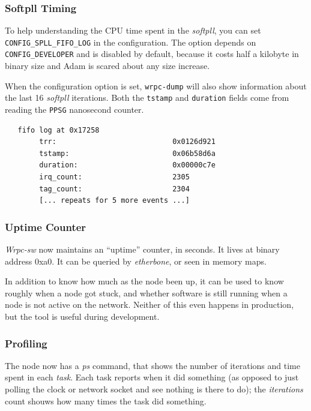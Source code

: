 \documentclass[a4paper, 12pt]{article}
\begin{document}
\subsubsection{Softpll Timing}

To help understanding the CPU time spent in the \textit{softpll}, you can
set \texttt{CONFIG\_SPLL\_FIFO\_LOG} in the configuration. The option
depends on \texttt{CONFIG\_DEVELOPER} and is disabled by default, because
it costs half a kilobyte in binary size and Adam is scared about any size
increase.

When the configuration option is set, \texttt{wrpc-dump} will also show
information about the last 16 \textit{softpll} iterations. Both the \texttt{tstamp}
and \texttt{duration} fields come from reading the \texttt{PPSG} nanosecond counter.

\begin{lstlisting}
   fifo log at 0x17258
        trr:                           0x0126d921
        tstamp:                        0x06b58d6a
        duration:                      0x00000c7e
        irq_count:                     2305
        tag_count:                     2304
        [... repeats for 5 more events ...]
\end{lstlisting}

\label{Uptime Counter}
\subsubsection{Uptime Counter}

\textit{Wrpc-sw} now maintains an ``uptime'' counter, in seconds. It lives
at binary address 0xa0. It can be queried by \textit{etherbone}, or
seen in memory maps.

In addition to know how much as the node been up, it can be used to
know roughly when a node got stuck, and whether software is still
running when a node is not active on the network. Neither of this even
happens in production, but the tool is useful during development.

\label{Profiling}
\subsubsection{Profiling}

The node now has a \textit{ps} command, that shows the number of iterations
and time spent in each \textit{task}. Each task reports when it did
something (as opposed to just polling the clock or network socket and
see nothing is there to do); the \textit{iterations} count shouws how many
times the task did something.
\end{document}
